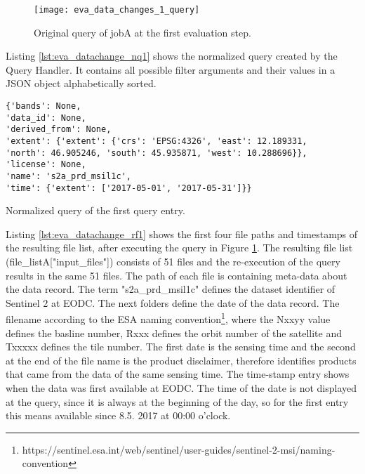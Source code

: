 \documentclass[draft,final]{vutinfth} %
\newenvironment{code}{\captionsetup{type=listing}}{}
\begin{document}
\begin{enumerate}
	\begin{figure}[h]
		\centering
		\texttt{[image: eva\_data\_changes\_1\_query]}
		\caption{Original query of jobA at the first evaluation step.}
		\label{fig:eva_data_changes_1_query} %
	\end{figure}
	
	Listing \ref{lst:eva_datachange_nq1} shows the normalized query created by the Query Handler. It contains all possible filter arguments and their values in a JSON object alphabetically sorted.
	
	\begin{code}
		\begin{verbatim}
{'bands': None, 
'data_id': None, 
'derived_from': None, 
'extent': {'extent': {'crs': 'EPSG:4326', 'east': 12.189331, 
'north': 46.905246, 'south': 45.935871, 'west': 10.288696}}, 
'license': None, 
'name': 's2a_prd_msil1c', 
'time': {'extent': ['2017-05-01', '2017-05-31']}}
		\end{verbatim}
		\caption{Normalized query of the first query entry.}
		\label{lst:eva_datachange_nq1}
	\end{code}
	
	Listing \ref{lst:eva_datachange_rf1} shows the first four file paths and timestamps of the resulting file list, after executing the query in Figure \ref{fig:eva_data_changes_1_query}. The resulting file list (file\_listA["input\_files"]) consists of 51 files and the re-execution of the query results in the same 51 files. The path of each file is containing meta-data about the data record. The term "s2a\_prd\_msil1c" defines the dataset identifier of Sentinel 2 at EODC. The next folders define the date of the data record. The filename according to the ESA naming convention\footnote{https://sentinel.esa.int/web/sentinel/user-guides/sentinel-2-msi/naming-convention}, where the Nxxyy value defines the basline number, Rxxx defines the orbit number of the satellite and Txxxxx defines the tile number. The first date is the sensing time and the second at the end of the file name is the product disclaimer, therefore identifies products that came from the data of the same sensing time. The time-stamp entry shows when the data was first available at EODC. The time of the date is not displayed at the query, since it is always at the beginning of the day, so for the first entry this means available since 8.5. 2017 at 00:00 o'clock.
	

\end{enumerate}
\end{document}
